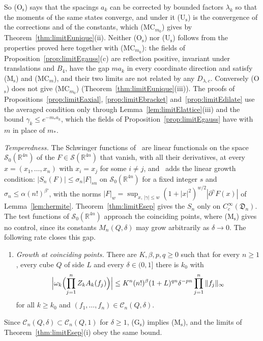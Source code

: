 \documentclass[aps,prd,twocolumn,superscriptaddress,nofootinbib,longbibliography,floatfix,amsmath,amssymb,10pt]{revtex4-2}
\theoremstyle{definition}
\theoremstyle{remark}
\newcommand{\R}{\mathbb{R}}
\begin{document}
So (O$_{\mathrm s}$) says that the spacings $a_k$ can be corrected by
bounded factors $\lambda_k$ so that the moments of the same states converge,
and under it (U$_{\mathrm s}$) is the convergence of the corrections and of
the constants, which (MC$_{m_0}$) gives by Theorem~\ref{thm:limitEunique}(ii).
Neither
(O$_{\mathrm s}$) nor (U$_{\mathrm s}$) follows from the properties proved
here together with (MC$_{m_0}$): the fields of
Proposition~\ref{prop:limitEgauss}(c) are reflection positive, invariant
under translations and $B_4$, have the gap $ma_k$ in every coordinate
direction and satisfy (M$_{\mathrm s}$) and (MC$_m$), and their two limits
are not related by any $D_{\lambda,c}$. Conversely (O$_{\mathrm s}$) does
not give (MC$_{m_0}$) (Theorem~\ref{thm:limitEunique}(iii)). The proofs of
Propositions~\ref{prop:limitEaxial}, \ref{prop:limitEbracket}
and~\ref{prop:limitEdilate} use the averaged condition only through
Lemma~\ref{lem:limitElattice}(iii) and the bound $\gamma_k\le e^{-m_*a_k}$,
which the fields of Proposition~\ref{prop:limitEgauss} have with $m$ in
place of $m_*$.

\emph{Temperedness.} The Schwinger functions of~\cite{OS73} are linear
functionals on the space $\mathcal S_0(\R^{4n})$ of the
$F\in\mathcal S(\R^{4n})$ that vanish, with all their derivatives, at every
$x=(x_1,\dots,x_n)$ with $x_i=x_j$ for some $i\ne j$, and~\cite{OS75} adds the
linear growth condition: $|S_n(F)|\le\sigma_n|F|_{sn}$ on
$\mathcal S_0(\R^{4n})$ for a fixed integer $s$ and $\sigma_n\le\alpha
(n!)^{\beta'}$, with the norms $|F|_w=\sup_{x,\,|\gamma|\le w}(1+|x|^2)^{w/2}
|\partial^\gamma F(x)|$ of Lemma~\ref{lem:hermite}. Theorem~\ref{thm:limitEsep}
gives the $S_n$ only on $C^\infty_c(\mathfrak D_n)$. The test functions of
$\mathcal S_0(\R^{4n})$ approach the coinciding points, where (M$_{\mathrm
s}$) gives no control, since its constants $M_n(Q,\delta)$ may grow arbitrarily
as $\delta\to0$. The following rate closes this gap.
\begin{enumerate}[label=\textup{(G$_{\mathrm s}$)},leftmargin=*]
\item \emph{Growth at coinciding points.} There are $K,\beta,p,q\ge0$ such
that for every $n\ge1$, every cube $Q$ of side $L$ and every $\delta\in(0,1]$
there is $k_0$ with
\[
\Bigl|\omega_k\Bigl(\prod_{j=1}^nZ_kA_k(f_j)\Bigr)\Bigr|\le
K^n(n!)^\beta(1+L)^{qn}\delta^{-pn}\prod_{j=1}^n\|f_j\|_\infty
\]
for all $k\ge k_0$ and $(f_1,\dots,f_n)\in\mathcal C_n(Q,\delta)$.
\end{enumerate}
Since $\mathcal C_n(Q,\delta)\subset\mathcal C_n(Q,1)$ for $\delta\ge1$,
(G$_{\mathrm s}$) implies (M$_{\mathrm s}$), and the limits of
Theorem~\ref{thm:limitEsep}(i) obey the same bound.
\end{document}
